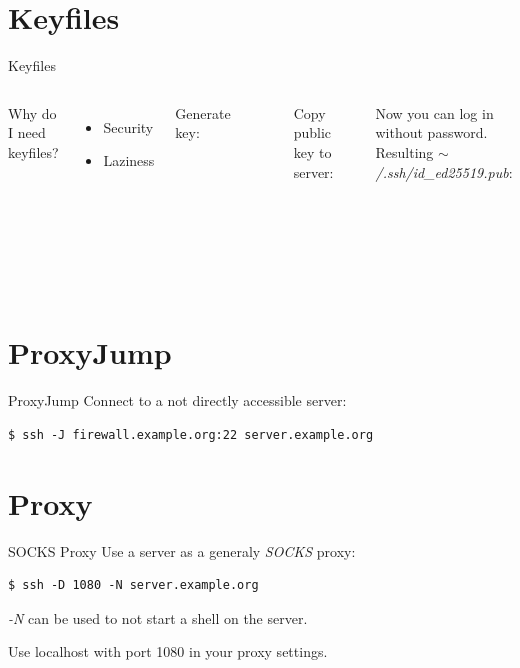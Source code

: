 \documentclass[10pt,graphics,aspectratio=169,table]{beamer}
\begin{document}
\section{Keyfiles}
\begin{frame}[fragile]{Keyfiles}
\begin{columns}
        Why do I need keyfiles?
        \begin{itemize}
            \item Security
            \item Laziness
        \end{itemize}
        Generate key:
        \begin{lstlisting}
$ ssh-keygen -t ed25519 -C me@mypc
        \end{lstlisting}
        \begin{lstlisting}
$ ssh-keygen -b 4096 -t rsa
        \end{lstlisting}
        Copy public key to server:
        \begin{lstlisting}
$ ssh-copy-id my@example.com
        \end{lstlisting}
        Now you can log in without password.
        Resulting \textit{$\sim$/.ssh/id\_ed25519.pub}:
        \begin{lstlisting}
ssh-ed25519 AAAAC3NzaC1lZ
DI1NTE5AAAAIJDzhzcMdEg7Nz
wwgB0bdOP1pDSKv5fsN4l4q8Y
ysLLX viktor@nerd101
        \end{lstlisting}
\end{columns}
\end{frame}

\section{ProxyJump}
\begin{frame}[fragile]{ProxyJump}
Connect to a not directly accessible server:
\begin{lstlisting}
$ ssh -J firewall.example.org:22 server.example.org
\end{lstlisting}
\end{frame}

\section{Proxy}
\begin{frame}[fragile]{SOCKS Proxy}
Use a server as a generaly \textit{SOCKS} proxy:
\begin{lstlisting}
$ ssh -D 1080 -N server.example.org
\end{lstlisting}
\textit{-N} can be used to not start a shell on the server.

Use localhost with port 1080 in your proxy settings.
\end{frame}
\end{document}
